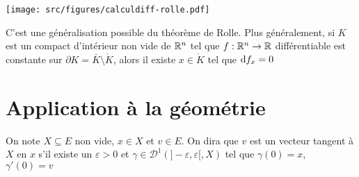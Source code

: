 \begin{center}
    \texttt{[image: src/figures/calculdiff-rolle.pdf]}
\end{center}

\begin{rem}
    C'est une généralisation possible du théorème de Rolle. Plus généralement, si $K$ est un compact d'intérieur non vide de $\mathbb R^n$ tel que $f:\mathbb R^n\to\mathbb R$ différentiable est constante sur $\partial K=\bar K\setminus \mathring K$, alors il existe $x\in\mathring K$ tel que $\mathrm{d} f_x=0$
\end{rem}

\section{Application à la géométrie}

\begin{dfn}
    On note $X\subseteq E$ non vide, $x\in X$ et $v\in E$. On dira que $v$ est un vecteur tangent à $X$ en $x$ s'il existe un $\varepsilon>0$ et $\gamma\in\mathcal D^1(]-\varepsilon, \varepsilon[, X)$ tel que $\gamma (0)=x$, $\gamma'(0)=v$
\end{dfn}

